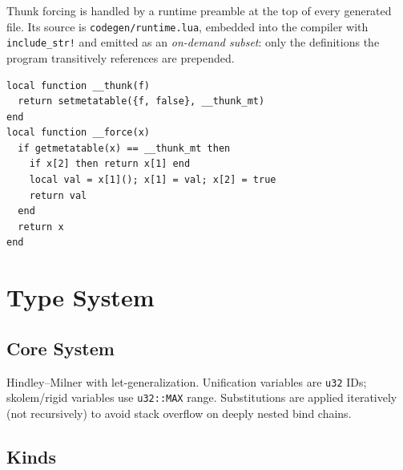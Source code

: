 \documentclass[11pt,a4paper]{article}
\begin{document}
\medskip

Thunk forcing is handled by a runtime preamble at the top of every generated
file.  Its source is \texttt{codegen/runtime.lua}, embedded into the compiler
with \texttt{include\_str!} and emitted as an \emph{on-demand subset}: only
the definitions the program transitively references are prepended.
\begin{lstlisting}[language={}]
local function __thunk(f)
  return setmetatable({f, false}, __thunk_mt)
end
local function __force(x)
  if getmetatable(x) == __thunk_mt then
    if x[2] then return x[1] end
    local val = x[1](); x[1] = val; x[2] = true
    return val
  end
  return x
end
\end{lstlisting}

\section{Type System}

\subsection{Core System}

Hindley--Milner with let-generalization.  Unification variables are \texttt{u32}
IDs; skolem/rigid variables use \texttt{u32::MAX} range.  Substitutions are
applied iteratively (not recursively) to avoid stack overflow on deeply nested
bind chains.

\subsection{Kinds}
\end{document}
